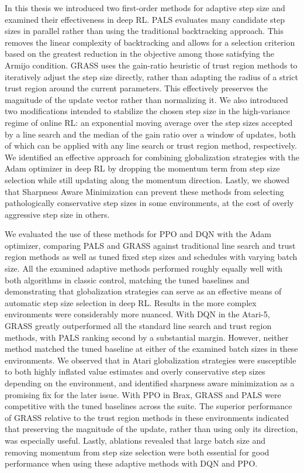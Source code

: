 In this thesis we introduced two first-order methods for adaptive step size and examined their effectiveness in deep RL. PALS evaluates many candidate step sizes in parallel rather than using the traditional backtracking approach. This removes the linear complexity of backtracking and allows for a selection criterion based on the greatest reduction in the objective among those satisfying the Armijo condition. GRASS uses the gain-ratio heuristic of trust region methods to iteratively adjust the step size directly, rather than adapting the radius of a strict trust region around the current parameters. This effectively preserves the magnitude of the update vector rather than normalizing it. We also introduced two modifications intended to stabilize the chosen step size in the high-variance regime of online RL: an exponential moving average over the step sizes accepted by a line search and the median of the gain ratio over a window of updates, both of which can be applied with any line search or trust region method, respectively. We identified an effective approach for combining globalization strategies with the Adam optimizer in deep RL by dropping the momentum term from step size selection while still updating along the momentum direction. Lastly, we showed that Sharpness Aware Minimization can prevent these methods from selecting pathologically conservative step sizes in some environments, at the cost of overly aggressive step size in others. 

We evaluated the use of these methods for PPO and DQN with the Adam optimizer, comparing PALS and GRASS against traditional line search and trust region methods as well as tuned fixed step sizes and schedules with varying batch size. All the examined adaptive methods performed roughly equally well with both algorithms in classic control, matching the tuned baselines and demonstrating that globalization strategies can serve as an effective means of automatic step size selection in deep RL. Results in the more complex environments were considerably more nuanced. With DQN in the Atari-5, GRASS greatly outperformed all the standard line search and trust region methods, with PALS ranking second by a substantial margin. However, neither method matched the tuned baseline at either of the examined batch sizes in these environments. We observed that in Atari globalization strategies were susceptible to both highly inflated value estimates and overly conservative step sizes depending on the environment, and identified sharpness aware minimization as a promising fix for the later issue. With PPO in Brax, GRASS and PALS were competitive with the tuned baselines across the suite. The superior performance of GRASS relative to the trust region methods in these environments indicated that preserving the magnitude of the update, rather than using only its direction, was especially useful. Lastly, ablations revealed that large batch size and removing momentum from step size selection were both essential for good performance when using these adaptive methods with DQN and PPO. 

